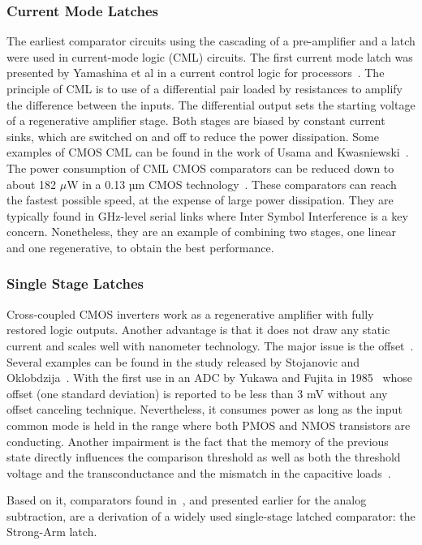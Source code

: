 \subsubsection{Current Mode Latches}
The earliest comparator circuits using the cascading of a pre-amplifier and a latch were used in current-mode logic (CML) circuits. The first current mode latch was presented by Yamashina et al in a current control logic for processors~\cite{Yamashina1994}. The principle of CML is to use of a differential pair loaded by resistances to amplify the difference between the inputs. The differential output sets the starting voltage of a regenerative amplifier stage. Both stages are biased by constant current sinks, which are switched on and off to reduce the power dissipation. Some examples of CMOS CML can be found in the work of Usama and Kwasniewski~\cite{Usama2004}. The power consumption of CML CMOS comparators can be reduced down to about 182 $\mu$W in a 0.13 µm CMOS technology~\cite{Zhang2014cmp}. These comparators can reach the fastest possible speed, at the expense of large power dissipation. They are typically found in GHz-level serial links where Inter Symbol Interference is a key concern. Nonetheless, they are an example of combining two stages, one linear and one regenerative, to obtain the best performance.

\subsubsection{Single Stage Latches}
Cross-coupled CMOS inverters work as a regenerative amplifier with fully restored logic outputs. Another advantage is that it does not draw any static current and scales well with nanometer technology. The major issue is the offset~\cite{Hajimiri1998}. Several examples can be found in the study released by Stojanovic and Oklobdzija~\cite{Nikolic2000}. With the first use in an ADC by Yukawa and Fujita in 1985~\cite{Yukawa1985} whose offset (one standard deviation) is reported to be less than 3 mV without any offset canceling technique. Nevertheless, it consumes power as long as the input common mode is held in the range where both PMOS and NMOS transistors are conducting. Another impairment is the fact that the memory of the previous state directly influences the comparison threshold as well as both the threshold voltage and the transconductance and the mismatch in the capacitive loads~\cite{Nikoozadeh2006}.

Based on it, comparators found in~\cite{Sumanen2000,Sumanen2002}, and presented earlier for the analog subtraction, are a derivation of a widely used single-stage latched comparator: the Strong-Arm latch.

